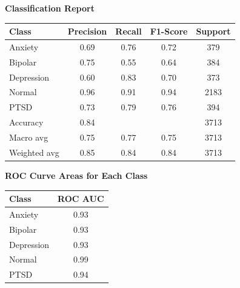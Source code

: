 \begin{center}
    \textbf{Classification Report} \\[0.5em]
    \begin{tabular}{|l|c|c|c|c|}
        \hline
        \textbf{Class}  & \textbf{Precision}  & \textbf{Recall} & \textbf{F1-Score} & \textbf{Support} \\ \hline
        Anxiety         & 0.69                & 0.76            & 0.72              & 379             \\ \hline
        Bipolar         & 0.75                & 0.55            & 0.64              & 384             \\ \hline
        Depression      & 0.60                & 0.83            & 0.70              & 373             \\ \hline
        Normal          & 0.96                & 0.91            & 0.94              & 2183            \\ \hline
        PTSD            & 0.73                & 0.79            & 0.76              & 394             \\ \hline
        Accuracy        & 0.84                &                 &                   & 3713            \\ \hline
        Macro avg       & 0.75                & 0.77            & 0.75              & 3713            \\ \hline
        Weighted avg    & 0.85                & 0.84            & 0.84              & 3713            \\ \hline
    \end{tabular}
\end{center}

\begin{center}
    \textbf{ROC Curve Areas for Each Class} \\[0.5em]
    \begin{tabular}{|l|c|}
        \hline
        \textbf{Class}  & \textbf{ROC AUC} \\ \hline
        Anxiety         & 0.93            \\ \hline
        Bipolar         & 0.93            \\ \hline
        Depression      & 0.93            \\ \hline
        Normal          & 0.99            \\ \hline
        PTSD            & 0.94            \\ \hline
    \end{tabular}
\end{center}

